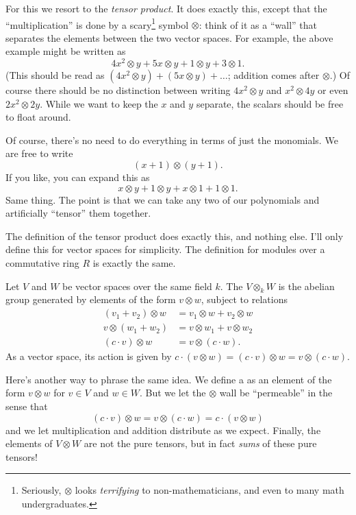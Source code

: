 For this we resort to the \emph{tensor product}.
It does exactly this, except that the ``multiplication''
is done by a scary\footnote{%
	Seriously, $\otimes$ looks \emph{terrifying} to non-mathematicians,
	and even to many math undergraduates.}
symbol $\otimes$:
think of it as a ``wall'' that separates the elements
between the two vector spaces.
For example, the above example might be written as
\[ 4x^2 \otimes y + 5x \otimes y + 1 \otimes y + 3 \otimes 1. \]
(This should be read as $(4x^2 \otimes y) + (5x \otimes y) + \dots$; addition comes after $\otimes$.)
Of course there should be no distinction between writing $4x^2 \otimes y$ and $x^2 \otimes 4y$ or even $2x^2 \otimes 2y$.
While we want to keep the $x$ and $y$ separate, the scalars should be free to float around.

Of course, there's no need to do everything in terms of just the monomials.
We are free to write
\[ (x + 1) \otimes (y + 1). \]
If you like, you can expand this as
\[ x \otimes y + 1 \otimes y + x \otimes 1 + 1 \otimes 1. \]
Same thing.
The point is that we can take any two of our polynomials
and artificially ``tensor'' them together.

The definition of the tensor product does exactly this,
and nothing else.
I'll only define this for vector spaces for simplicity.
The definition for modules over a commutative ring $R$ is exactly the same.
\begin{definition}
	Let $V$ and $W$ be vector spaces over the same field $k$.
	The  $V \otimes_k W$ is the abelian group
	generated by elements of the form $v \otimes w$, subject to relations
	\begin{align*}
		(v_1 + v_2) \otimes w &= v_1 \otimes w + v_2 \otimes w \\
		v \otimes (w_1 + w_2) &= v \otimes w_1 + v \otimes w_2 \\
		(c \cdot v) \otimes w &= v \otimes (c \cdot w).
	\end{align*}
	As a vector space,
	its action is given by
	$c \cdot (v \otimes w) = (c \cdot v) \otimes w = v \otimes (c \cdot w)$.
\end{definition}
Here's another way to phrase the same idea.
We define a  as an
element of the form $v \otimes w$ for $v \in V$ and $w \in W$.
But we let the $\otimes$ wall be ``permeable'' in the sense that
\[ (c \cdot v) \otimes w = v \otimes (c \cdot w) = c \cdot (v \otimes w) \]
and we let multiplication and addition distribute as we expect.
Finally, the elements of $V \otimes W$ are not the pure tensors,
but in fact \emph{sums} of these pure tensors!


